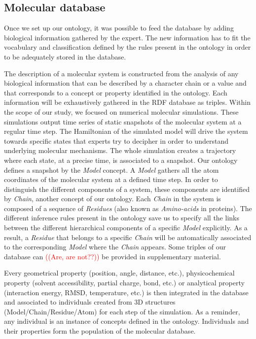 \documentclass{vgtc}                          %
\newcommand*\mvb[1]{\textcolor{red}{#1}}
\begin{document}
\subsection{Molecular database}

Once we set up our ontology, it was possible to feed the database by adding biological information gathered by the expert. The new information has to fit the vocabulary and classification defined by the rules present in the ontology in order to be adequately stored in the database.

The description of a molecular system is constructed from the analysis of any biological information that can be described by a character chain or a value and that corresponds to a concept or property identified in the ontology. Each information will be exhaustively gathered in the RDF database as triples. Within the scope of our study, we focused on numerical molecular simulations. These simulations output time series of static snapshots of the molecular system at a regular time step. The Hamiltonian of the simulated model will drive the system towards specific states that experts try to decipher in order to understand underlying molecular mechanisms. The whole simulation creates a trajectory where each state, at a precise time, is associated to a snapshot. Our ontology defines a snapshot by the \textit{Model} concept. A \textit{Model} gathers all the atom coordinates of the molecular system at a defined time step. In order to distinguish the different components of a system, these components are identified by \textit{Chain}, another concept of our ontology. Each \textit{Chain} in the system is composed of a sequence of \textit{Residues} (also known as \textit{Amino-acids} in proteins). The different inference rules present in the ontology save us to specify all the links between the different hierarchical components of a specific \textit{Model} explicitly. As a result, a \textit{Residue} that belongs to a specific \textit{Chain} will be automatically associated to the corresponding \textit{Model} where the \textit{Chain} appears.
Some triples of our database can \mvb{((Are, are not??))} be provided in supplementary material.

Every geometrical property (position, angle, distance, etc.), physicochemical property (solvent accessibility, partial charge, bond, etc.) or analytical property (interaction energy, RMSD, temperature, etc.) is then integrated in the database and associated to individuals created from 3D structures (Model/Chain/Residue/Atom) for each step of the simulation. As a reminder, any individual is an instance of concepts defined in the ontology. Individuals and their properties form the population of the molecular database.
\end{document}
